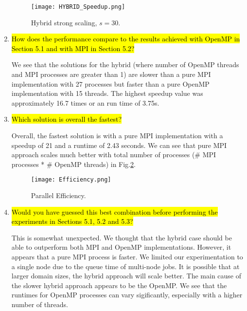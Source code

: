 \documentclass{article}
\begin{document}
\begin{enumerate}
\begin{description}
	\end{description}
		
	\begin{figure}[p] %
	 	\begin{center}
	 		\texttt{[image: HYBRID\_Speedup.png]} %
	 		\caption{Hybrid strong scaling, $s=30$.}
	 		\label{fig:hybrid_speedup}
	 	\end{center}
	\end{figure}
	
	\item \hl{How does the performance compare to the results achieved with OpenMP in Section 5.1 and with MPI in Section 5.2?}

	We see that the solutions for the hybrid (where number of OpenMP threads and MPI processes are greater than 1) are slower than a pure MPI implementation with 27 processes but faster than a pure OpenMP implementation with 15 threads. The highest speedup value was approximately 16.7 times or an run time of 3.75s. 
	
	\item \hl{Which solution is overall the fastest?}

	Overall, the fastest solution is with a pure MPI implementation with a speedup of 21 and a runtime of 2.43 seconds. We can see that pure MPI approach scales much better with total number of processes (\# MPI processes * \# OpenMP threads) in Fig.\ref{fig:efficiency}.
	
		\begin{figure}[p] %
	 	\begin{center}
	 		\texttt{[image: Efficiency.png]} %
	 		\caption{Parallel Efficiency.}
	 		\label{fig:efficiency}
	 	\end{center}
	\end{figure}
	
	\item \hl{Would you have guessed this best combination before performing the experiments in Sections 5.1, 5.2 and 5.3?}

	This is somewhat unexpected. We thought that the hybrid case should be able to outperform both MPI and OpenMP implementations. However, it appears that a pure MPI process is faster. We limited our experimentation to a single node due to the queue time of multi-node jobs. It is possible that at larger domain sizes, the hybrid approach will scale better. The main cause of the slower hybrid approach appears to be the OpenMP. We see that the runtimes for OpenMP processes can vary sigificantly, especially with a higher number of threads. 
\end{enumerate}
\end{document}
